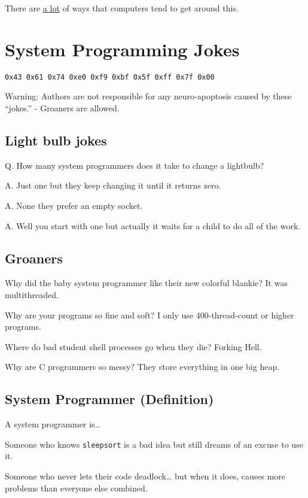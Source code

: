 There are \href{https://en.wikipedia.org/wiki/Stack_buffer_overflow}{a lot} of ways that computers tend to get around this.

\section{System Programming Jokes}

\texttt{0x43\ 0x61\ 0x74\ 0xe0\ 0xf9\ 0xbf\ 0x5f\ 0xff\ 0x7f\ 0x00}

Warning: Authors are not responsible for any neuro-apoptosis caused by these ``jokes.'' - Groaners are allowed.

\subsection{Light bulb jokes}

Q. How many system programmers does it take to change a lightbulb?

A. Just one but they keep changing it until it returns zero.

A. None they prefer an empty socket.

A. Well you start with one but actually it waits for a child to do all of the work.

\subsection{Groaners}

Why did the baby system programmer like their new colorful blankie? It was multithreaded.

Why are your programs so fine and soft? I only use 400-thread-count or higher programs.

Where do bad student shell processes go when they die? Forking Hell.

Why are C programmers so messy? They store everything in one big heap.

\subsection{System Programmer (Definition)}

A system programmer is\ldots{}

Someone who knows \texttt{sleepsort} is a bad idea but still dreams of an excuse to use it.

Someone who never lets their code deadlock\ldots{} but when it does, causes more problems than everyone else combined.

